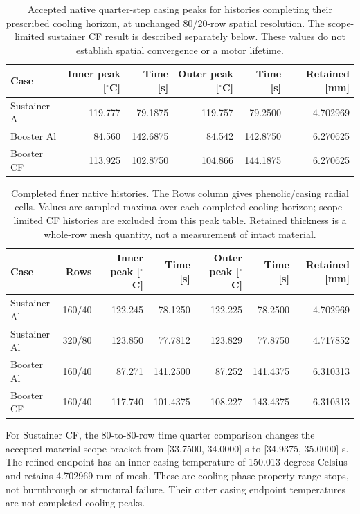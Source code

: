 \documentclass[oneside,openany]{amsdtx}
\begin{document}
\begin{table}[H]\centering\scriptsize\begin{tabular}{lrrrrr}\toprule Case & Inner peak [$^\circ$C] & Time [s] & Outer peak [$^\circ$C] & Time [s] & Retained [mm]\\\midrule

Sustainer Al & 119.777 & 79.1875 & 119.757 & 79.2500 & 4.702969 \\
Booster Al & 84.560 & 142.6875 & 84.542 & 142.8750 & 6.270625 \\
Booster CF & 113.925 & 102.8750 & 104.866 & 144.1875 & 6.270625 \\

\bottomrule\end{tabular}\caption{Accepted native quarter-step casing peaks for histories completing their prescribed cooling horizon, at unchanged 80/20-row spatial resolution. The scope-limited sustainer CF result is described separately below. These values do not establish spatial convergence or a motor lifetime.}\end{table}

\begin{table}[H]\centering\scriptsize\begin{tabular}{lrrrrrr}\toprule Case & Rows & Inner peak [$^\circ$C] & Time [s] & Outer peak [$^\circ$C] & Time [s] & Retained [mm]\\\midrule

Sustainer Al & 160/40 & 122.245 & 78.1250 & 122.225 & 78.2500 & 4.702969 \\
Sustainer Al & 320/80 & 123.850 & 77.7812 & 123.829 & 77.8750 & 4.717852 \\
Booster Al & 160/40 & 87.271 & 141.2500 & 87.252 & 141.4375 & 6.310313 \\
Booster CF & 160/40 & 117.740 & 101.4375 & 108.227 & 143.4375 & 6.310313 \\

\bottomrule\end{tabular}\caption{Completed finer native histories. The Rows column gives phenolic/casing radial cells. Values are sampled maxima over each completed cooling horizon; scope-limited CF histories are excluded from this peak table. Retained thickness is a whole-row mesh quantity, not a measurement of intact material.}\end{table}

For Sustainer CF, the 80-to-80-row time quarter comparison changes the accepted material-scope bracket from [33.7500, 34.0000] s to [34.9375, 35.0000] s. The refined endpoint has an inner casing temperature of 150.013 degrees Celsius and retains 4.702969 mm of mesh. These are cooling-phase property-range stops, not burnthrough or structural failure. Their outer casing endpoint temperatures are not completed cooling peaks.
\end{document}
